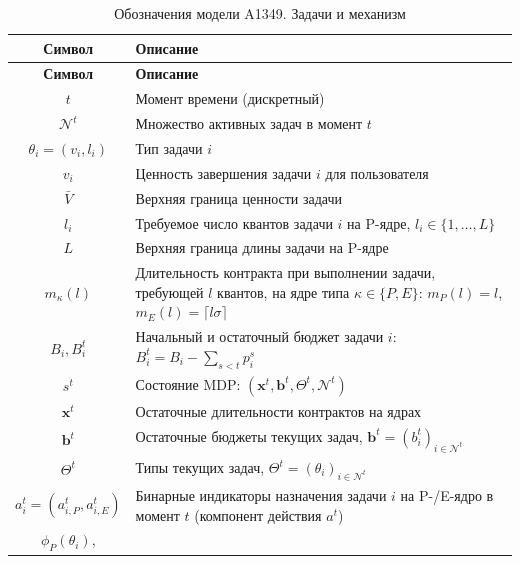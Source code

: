 \documentclass[14pt, oneside]{extbook}
\begin{document}
\begin{center}
\renewcommand{\arraystretch}{0.85}
\begin{longtable}{|c|p{11cm}|}
        \caption{Обозначения модели A1349. Задачи и механизм}
        \label{tab:notation_mechanism} \\
        \hline
        \textbf{Символ} & \textbf{Описание} \\
        \hline
        \endfirsthead
        \hline
        \textbf{Символ} & \textbf{Описание} \\
        \hline
        \endhead
        $t$ & Момент времени (дискретный) \\
        $\mathcal{N}^t$ & Множество активных задач
              в момент $t$ \\
        $\theta_i = (v_i, l_i)$ & Тип задачи $i$ \\
        $v_i$ & Ценность завершения задачи $i$ для
              пользователя \\
        $\bar{V}$ & Верхняя граница ценности задачи \\
        $l_i$ & Требуемое число квантов задачи $i$
              на P-ядре, $l_i \in \{1, \ldots, L\}$ \\
        $L$ & Верхняя граница длины задачи на P-ядре \\
        $m_\kappa(l)$ & Длительность контракта при
              выполнении задачи, требующей $l$ квантов,
              на ядре типа $\kappa \in \{P, E\}$:
              $m_P(l) = l$,
              $m_E(l) = \lceil l\sigma\rceil$ \\
        $B_i, B_i^t$ & Начальный и остаточный бюджет
              задачи $i$: $B_i^t = B_i - \sum_{s<t} p_i^s$ \\
        $s^t$ & Состояние MDP:
              $(\mathbf{x}^t, \mathbf{b}^t,
              \Theta^t, \mathcal{N}^t)$ \\
        $\mathbf{x}^t$ & Остаточные длительности
              контрактов на ядрах \\
        $\mathbf{b}^t$ & Остаточные бюджеты текущих задач,
              $\mathbf{b}^t = (b_i^t)_{i \in \mathcal{N}^t}$ \\
        $\Theta^t$ & Типы текущих задач,
              $\Theta^t = (\theta_i)_{i \in \mathcal{N}^t}$ \\
        $a_i^t = (a_{i,P}^t, a_{i,E}^t)$ &
              Бинарные индикаторы назначения
              задачи $i$ на P-/E-ядро в момент $t$
              (компонент действия $a^t$) \\
        $\phi_P(\theta_i)$,

\end{longtable}
\end{center}
\end{document}
